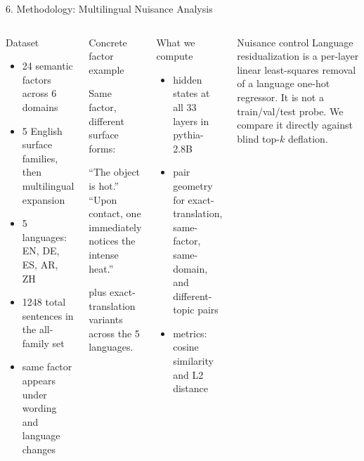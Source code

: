 \documentclass[aspectratio=169,11pt]{beamer}
\begin{document}
\begin{frame}{6. Methodology: Multilingual Nuisance Analysis}
  \begin{columns}[T,totalwidth=\textwidth]
      \begin{block}{Dataset}
      {\scriptsize
      \begin{itemize}
        \item 24 semantic factors across 6 domains
        \item 5 English surface families, then multilingual expansion
        \item 5 languages: EN, DE, ES, AR, ZH
        \item 1248 total sentences in the all-family set
        \item same factor appears under wording and language changes
      \end{itemize}
      }
      \end{block}

      \begin{block}{Concrete factor example}
      {\scriptsize
      Same factor, different surface forms:

      ``The object is hot.''\\
      ``Upon contact, one immediately notices the intense heat.''

      plus exact-translation variants across the 5 languages.
      }
      \end{block}
      \begin{block}{What we compute}
      {\scriptsize
      \begin{itemize}
        \item hidden states at all 33 layers in pythia-2.8B
        \item pair geometry for exact-translation, same-factor, same-domain, and different-topic pairs
        \item metrics: cosine similarity and L2 distance
      \end{itemize}
      }
      \end{block}

      \begin{block}{Nuisance control}
      {\scriptsize
      Language residualization is a per-layer linear least-squares removal of a language one-hot regressor. It is not a train/val/test probe. We compare it directly against blind top-\(k\) deflation.
      }
      \end{block}
  \end{columns}
\end{frame}
\end{document}
